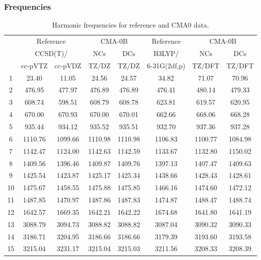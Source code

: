 \documentclass[10pt,oneside]{article}
\begin{document}
\subsubsection*{Frequencies}
\begin{table}[h!]
\centering
\caption{Harmonic frequencies for reference and CMA0 data.}
\begin{tabular}{cccccccc}
\toprule
{} & \multicolumn{2}{c}{Reference} & \multicolumn{2}{c}{CMA-0B} &    Reference & \multicolumn{2}{c}{CMA-0B} \\
{} & \multicolumn{2}{c}{CCSD(T)/} &     NCs &     DCs &       B3LYP/ &     NCs &     DCs \\
{} &   cc-pVTZ & cc-pVDZ &   TZ/DZ &   TZ/DZ & 6-31G(2df,p) &  TZ/DFT &  TZ/DFT \\
\midrule
1  &     23.40 &   11.05 &   24.56 &   24.57 &        34.82 &   71.07 &   70.96 \\
2  &    476.95 &  477.97 &  476.89 &  476.89 &       476.41 &  480.14 &  479.33 \\
3  &    608.74 &  598.51 &  608.79 &  608.78 &       623.81 &  619.57 &  620.95 \\
4  &    670.00 &  670.93 &  670.00 &  670.01 &       662.66 &  668.06 &  668.28 \\
5  &    935.44 &  934.12 &  935.52 &  935.51 &       932.70 &  937.36 &  937.28 \\
6  &   1110.76 & 1099.66 & 1110.98 & 1110.98 &      1106.83 & 1100.77 & 1084.98 \\
7  &   1142.47 & 1124.00 & 1142.63 & 1142.59 &      1133.67 & 1132.80 & 1150.02 \\
8  &   1409.56 & 1396.46 & 1409.87 & 1409.76 &      1397.13 & 1407.47 & 1409.63 \\
9  &   1425.54 & 1423.87 & 1425.17 & 1425.34 &      1438.66 & 1428.43 & 1428.61 \\
10 &   1475.67 & 1458.55 & 1475.88 & 1475.85 &      1466.16 & 1474.60 & 1472.12 \\
11 &   1487.85 & 1470.97 & 1487.86 & 1487.83 &      1474.87 & 1488.47 & 1488.74 \\
12 &   1642.57 & 1669.35 & 1642.21 & 1642.22 &      1674.68 & 1641.80 & 1641.19 \\
13 &   3088.79 & 3094.73 & 3088.82 & 3088.82 &      3087.04 & 3090.32 & 3090.33 \\
14 &   3186.71 & 3204.95 & 3186.66 & 3186.66 &      3179.39 & 3193.60 & 3193.58 \\
15 &   3215.04 & 3231.17 & 3215.04 & 3215.03 &      3211.56 & 3208.33 & 3208.39 \\
\bottomrule
\end{tabular}
\end{table}
\end{document}
